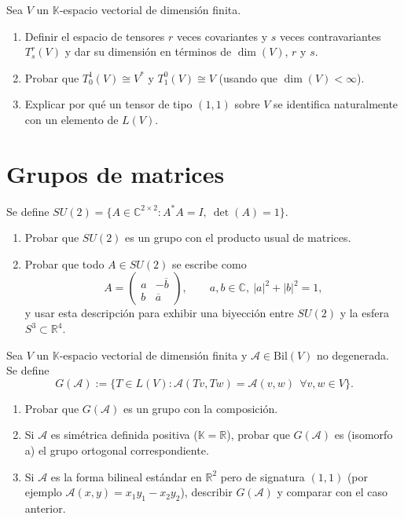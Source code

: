 \documentclass{article}
\newcommand{\R}{\mathbb{R}}
\newcommand{\C}{\mathbb{C}}
\newcommand{\K}{\mathbb{K}}
\DeclareMathOperator{\dimm}{dim}
\theoremstyle{plain}
\theoremstyle{definition}
\theoremstyle{remark}
\newenvironment{ejercicio}[1]{\begin{trivlist}
\item[\hskip \labelsep {\bfseries Ejercicio}\hskip \labelsep {\bfseries #1.}]}{\end{trivlist}}
\begin{document}
\begin{ejercicio}{25}
    Sea \(V\) un \(\K\)-espacio vectorial de dimensión finita.
    \begin{enumerate}
        \item Definir el espacio de tensores \(r\) veces covariantes y \(s\) veces contravariantes \(T^r_s(V)\) y dar su dimensión en términos de \(\dimm(V)\), \(r\) y \(s\).
        \item Probar que \(T^1_0(V) \cong V^*\) y \(T^0_1(V) \cong V\) (usando que \(\dimm(V) < \infty\)).
        \item Explicar por qué un tensor de tipo \((1,1)\) sobre \(V\) se identifica naturalmente con un elemento de \(L(V)\).
    \end{enumerate}
\end{ejercicio}

\section{Grupos de matrices}

\begin{ejercicio}{26}
    Se define \(SU(2) = \{A \in \C^{2\times 2} : A^*A = I,\ \det(A) = 1\}\).
    \begin{enumerate}
        \item Probar que \(SU(2)\) es un grupo con el producto usual de matrices.
        \item Probar que todo \(A \in SU(2)\) se escribe como
              \[
                  A = \begin{pmatrix} a & -\overline b \\ b & \overline a\end{pmatrix}, \qquad a,b \in \C,\ |a|^2+|b|^2=1,
              \]
              y usar esta descripción para exhibir una biyección entre \(SU(2)\) y la esfera \(S^3 \subset \R^4\).
    \end{enumerate}
\end{ejercicio}

\begin{ejercicio}{27}
    Sea \(V\) un \(\K\)-espacio vectorial de dimensión finita y \(\mathcal A \in \mathrm{Bil}(V)\) no degenerada. Se define
    \[
        G(\mathcal A) := \{T \in L(V) : \mathcal A(Tv,Tw) = \mathcal A(v,w) \ \ \forall v,w \in V\}.
    \]
    \begin{enumerate}
        \item Probar que \(G(\mathcal A)\) es un grupo con la composición.
        \item Si \(\mathcal A\) es simétrica definida positiva (\(\K = \R\)), probar que \(G(\mathcal A)\) es (isomorfo a) el grupo ortogonal correspondiente.
        \item Si \(\mathcal A\) es la forma bilineal estándar en \(\R^{2}\) pero de signatura \((1,1)\) (por ejemplo \(\mathcal A(x,y) = x_1y_1 - x_2y_2\)), describir \(G(\mathcal A)\) y comparar con el caso anterior.
    \end{enumerate}
\end{ejercicio}
\end{document}
